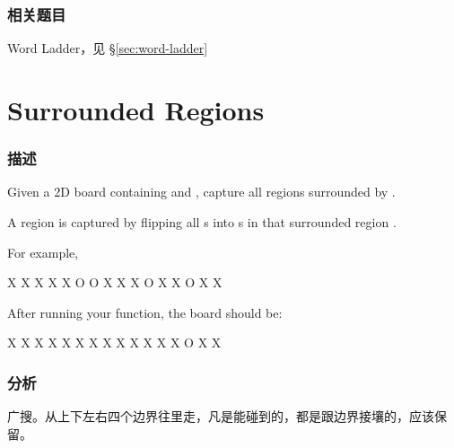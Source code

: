 \subsubsection{相关题目}

\begindot
\item Word Ladder，见 \S \ref{sec:word-ladder}
\myenddot


\section{Surrounded Regions} %
\label{sec:surrounded-regions}


\subsubsection{描述}
Given a 2D board containing  and , capture all regions surrounded by .

A region is captured by flipping all s into s in that surrounded region .

For example,
\begin{Code}
X X X X
X O O X
X X O X
X O X X
\end{Code}

After running your function, the board should be:
\begin{Code}
X X X X
X X X X
X X X X
X O X X
\end{Code}


\subsubsection{分析}
广搜。从上下左右四个边界往里走，凡是能碰到的，都是跟边界接壤的，应该保留。


